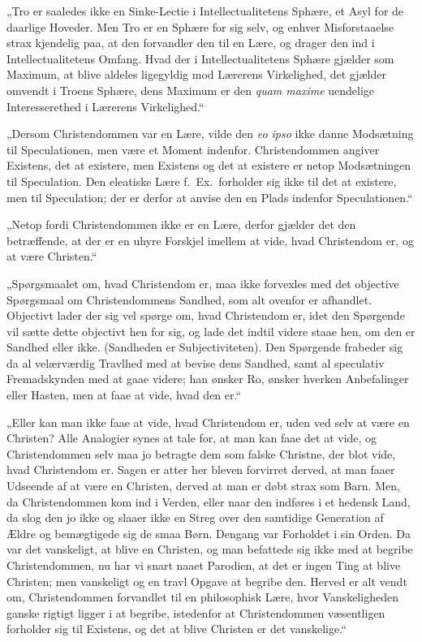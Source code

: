  „Tro er saaledes ikke en Sinke-Lectie i Intellectualitetens
Sphære, et Asyl for de daarlige Hoveder. Men Tro er en Sphære for
sig selv, og enhver Misforstaaelse strax kjendelig paa, at den
forvandler den til en Lære, og drager den ind i Intellectualitetens
Omfang. Hvad der i Intellectualitetens Sphære gjælder som Maximum,
at blive aldeles ligegyldig mod Lærerens Virkelighed, det gjælder
omvendt i Troens Sphære, dens Maximum er den \textit{quam maxime}
uendelige Interesserethed i Lærerens Virkelighed.“

„Dersom Christendommen var en Lære, vilde den \textit{eo ipso}
ikke danne Modsætning til Speculationen, men være et Moment
indenfor. Christendommen angiver Existens, det at existere, men
Existens og det at existere er netop Modsætningen til Speculation.
Den eleatiske Lære f.\ Ex.\ forholder sig ikke til det at
existere, men til Speculation; der er derfor at anvise den en
Plads indenfor Speculationen.“

„Netop fordi Christendommen ikke er en Lære, derfor gjælder det
den betræffende, at der er en uhyre Forskjel imellem at vide, hvad
Christendom er, og at være Christen.“

„Spørgsmaalet om, hvad Christendom er, maa ikke forvexles
{} med det objective Spørgsmaal om Christendommens Sandhed, som
alt ovenfor er afhandlet. Objectivt lader der sig vel spørge om,
hvad Christendom er, idet den Spørgende vil sætte dette objectivt
hen for sig, og lade det indtil videre staae hen, om den er
 Sandhed eller ikke. (Sandheden er Subjectiviteten). Den Spørgende
frabeder sig da al velærværdig Travlhed med at bevise dens
Sandhed, samt al speculativ Fremadskynden med at gaae videre; han
ønsker Ro, ønsker hverken Anbefalinger eller Hasten, men at faae
at vide, hvad den er.“

„Eller kan man ikke faae at vide, hvad Christendom er, uden ved
selv at være en Christen? Alle Analogier synes at tale for, at man
kan faae det at vide, og Christendommen selv maa jo betragte dem
som falske Christne, der blot vide, hvad Christendom er. Sagen er
atter her bleven forvirret derved, at man faaer Udseende af at
være en Christen, derved at man er døbt strax som Barn. Men, da
Christendommen kom ind i Verden, eller naar den indføres i et
hedensk Land, da slog den jo ikke og slaaer ikke en Streg over den
samtidige Generation af Ældre og bemægtigede sig de smaa Børn.
Dengang var Forholdet i sin Orden. Da var det vanskeligt, at blive
en Christen, og man befattede sig ikke med at begribe
Christendommen, nu har vi snart naaet Parodien, at det er ingen
Ting at blive Christen; men vanskeligt og en travl Opgave at
begribe den. Herved er alt vendt om, Christendommen forvandlet til
en philosophisk Lære, hvor Vanskeligheden ganske rigtigt ligger i
at begribe, istedenfor at Christendommen væsentligen forholder sig
til Existens, og det at blive Christen er det vanskelige.“

